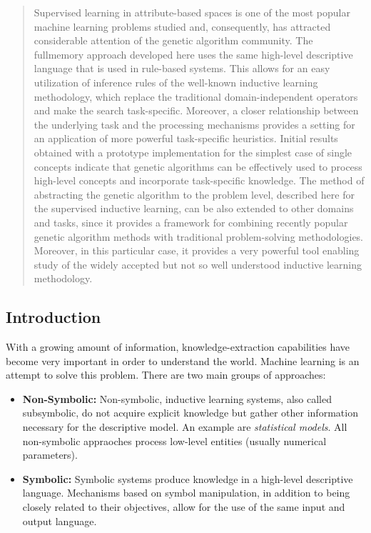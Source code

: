 \documentclass[../main.tex]{subfiles}
\begin{document}
\begin{mdframed}
\end{mdframed}

\begin{abstract}
Supervised learning in attribute-based spaces is one of the most popular machine learning problems studied and,
consequently, has attracted considerable attention of the genetic algorithm community. The fullmemory approach
developed here uses the same high-level descriptive language that is used in rule-based systems. This allows for an
easy utilization of inference rules of the well-known inductive learning methodology, which replace the traditional
domain-independent operators and make the search task-specific. Moreover, a closer relationship between the underlying
task and the processing mechanisms provides a setting for an application of more powerful task-specific heuristics.
Initial results obtained with a prototype implementation for the simplest case of single concepts indicate that genetic
algorithms can be effectively used to process high-level concepts and incorporate task-specific knowledge. The method
of abstracting the genetic algorithm to the problem level, described here for the supervised inductive learning, can be
also extended to other domains and tasks, since it provides a framework for combining recently popular genetic
algorithm methods with traditional problem-solving methodologies. Moreover, in this particular case, it provides a very
powerful tool enabling study of the widely accepted but not so well understood inductive learning methodology.
\end{abstract}

\subsection{Introduction}

With a growing amount of information, knowledge-extraction capabilities have become very important in order to
understand the world. Machine learning is an attempt to solve this problem. There are two main groups of approaches:

\begin{itemize}
	\item \textbf{Non-Symbolic:} Non-symbolic, inductive learning systems, also called subsymbolic, do not acquire
	explicit knowledge but gather other information necessary for the descriptive model. An example are
	\emph{statistical models}. All non-symbolic appraoches process low-level entities (usually numerical parameters).
	\item \textbf{Symbolic:}  Symbolic systems produce knowledge in a high-level descriptive language. Mechanisms based
	on symbol manipulation, in addition to being closely related to their objectives, allow for the use of the same
	input and output language.
\end{itemize}
\end{document}
